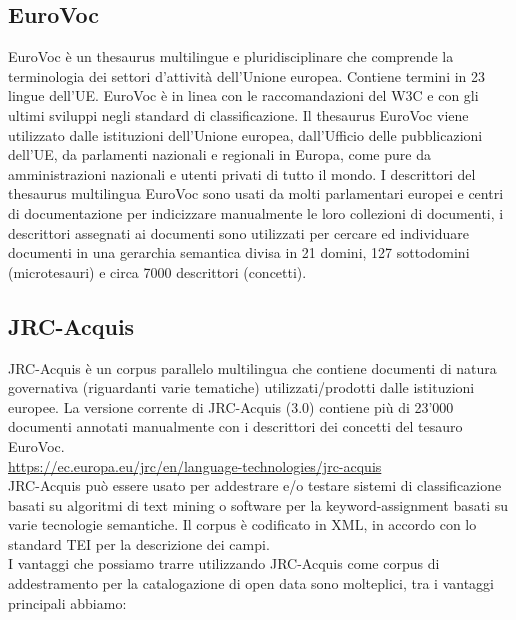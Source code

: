 \documentclass{article}
\theoremstyle{plain}
\theoremstyle{definition}
\begin{document}
\subsection{EuroVoc}
EuroVoc è un thesaurus multilingue e pluridisciplinare che comprende la terminologia dei settori d'attività dell'Unione europea. Contiene termini in 23 lingue dell'UE. EuroVoc è in linea con le raccomandazioni del W3C e con gli ultimi sviluppi negli standard di classificazione. Il thesaurus EuroVoc viene utilizzato dalle istituzioni dell'Unione europea, dall'Ufficio delle pubblicazioni dell'UE, da parlamenti nazionali e regionali in Europa, come pure da amministrazioni nazionali e utenti privati di tutto il mondo.
\footnotemark
{}
I descrittori del thesaurus multilingua EuroVoc sono usati da molti parlamentari europei e centri di documentazione per indicizzare manualmente le loro collezioni di documenti, i descrittori assegnati ai documenti sono utilizzati per cercare ed individuare documenti in una gerarchia semantica divisa in 21 domini, 127 sottodomini (microtesauri) e circa 7000 descrittori (concetti).

\subsection{JRC-Acquis}
JRC-Acquis è un corpus parallelo multilingua che contiene documenti di natura governativa (riguardanti varie tematiche) utilizzati/prodotti dalle istituzioni europee.  
La versione corrente di JRC-Acquis (3.0) contiene più di 23'000 documenti annotati manualmente con i descrittori dei concetti del tesauro EuroVoc. 
\\
\url{https://ec.europa.eu/jrc/en/language-technologies/jrc-acquis}
\\
JRC-Acquis può essere usato per addestrare e/o testare sistemi di classificazione basati su algoritmi di text mining o software per la keyword-assignment basati su varie tecnologie semantiche. Il corpus è codificato in XML, in accordo con lo standard TEI per la descrizione dei campi.
\footnotemark
{}
\\
I vantaggi che possiamo trarre utilizzando JRC-Acquis come corpus di addestramento per la catalogazione di open data sono molteplici, tra i vantaggi principali abbiamo: 
\end{document}
